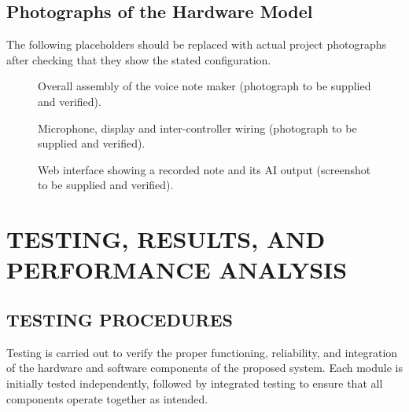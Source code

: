 \documentclass[a4paper,12pt,oneside]{report}
\begin{document}
\section{Photographs of the Hardware Model}
The following placeholders should be replaced with actual project photographs after checking that they show the stated configuration.
\begin{figure}[htbp]
\centering
{}
\caption{Overall assembly of the voice note maker (photograph to be supplied and verified).}
\label{fig:assembly-photo}
\end{figure}
\begin{figure}[htbp]
\centering
{}
\caption{Microphone, display and inter-controller wiring (photograph to be supplied and verified).}
\label{fig:wiring-photo}
\end{figure}
\begin{figure}[htbp]
\centering
{}
\caption{Web interface showing a recorded note and its AI output (screenshot to be supplied and verified).}
\label{fig:web-photo}
\end{figure}



\newpage
\chapter{TESTING, RESULTS, AND PERFORMANCE ANALYSIS}

\section{TESTING PROCEDURES}


Testing is carried out to verify the proper functioning, reliability,
and integration of the hardware and software components of the
proposed system. Each module is initially tested independently,
followed by integrated testing to ensure that all components
operate together as intended.
\end{document}
